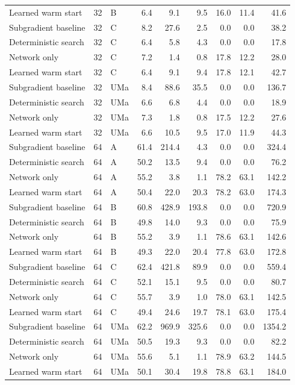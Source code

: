 \documentclass[10pt,letterpaper]{article}
\begin{document}
\begin{longtable}{lrlrrrrrr}
Learned warm start & 32 & B & 6.4 & 9.1 & 9.5 & 16.0 & 11.4 & 41.6\\
Subgradient baseline & 32 & C & 8.2 & 27.6 & 2.5 & 0.0 & 0.0 & 38.2\\
Deterministic search & 32 & C & 6.4 & 5.8 & 4.3 & 0.0 & 0.0 & 17.8\\
Network only & 32 & C & 7.2 & 1.4 & 0.8 & 17.8 & 12.2 & 28.0\\
Learned warm start & 32 & C & 6.4 & 9.1 & 9.4 & 17.8 & 12.1 & 42.7\\
Subgradient baseline & 32 & UMa & 8.4 & 88.6 & 35.5 & 0.0 & 0.0 & 136.7\\
Deterministic search & 32 & UMa & 6.6 & 6.8 & 4.4 & 0.0 & 0.0 & 18.9\\
Network only & 32 & UMa & 7.3 & 1.8 & 0.8 & 17.5 & 12.2 & 27.6\\
Learned warm start & 32 & UMa & 6.6 & 10.5 & 9.5 & 17.0 & 11.9 & 44.3\\
Subgradient baseline & 64 & A & 61.4 & 214.4 & 4.3 & 0.0 & 0.0 & 324.4\\
Deterministic search & 64 & A & 50.2 & 13.5 & 9.4 & 0.0 & 0.0 & 76.2\\
Network only & 64 & A & 55.2 & 3.8 & 1.1 & 78.2 & 63.1 & 142.2\\
Learned warm start & 64 & A & 50.4 & 22.0 & 20.3 & 78.2 & 63.0 & 174.3\\
Subgradient baseline & 64 & B & 60.8 & 428.9 & 193.8 & 0.0 & 0.0 & 720.9\\
Deterministic search & 64 & B & 49.8 & 14.0 & 9.3 & 0.0 & 0.0 & 75.9\\
Network only & 64 & B & 55.2 & 3.9 & 1.1 & 78.6 & 63.1 & 142.6\\
Learned warm start & 64 & B & 49.3 & 22.0 & 20.4 & 77.8 & 63.0 & 172.8\\
Subgradient baseline & 64 & C & 62.4 & 421.8 & 89.9 & 0.0 & 0.0 & 559.4\\
Deterministic search & 64 & C & 52.1 & 15.1 & 9.5 & 0.0 & 0.0 & 80.7\\
Network only & 64 & C & 55.7 & 3.9 & 1.0 & 78.0 & 63.1 & 142.5\\
Learned warm start & 64 & C & 49.4 & 24.6 & 19.7 & 78.1 & 63.0 & 175.4\\
Subgradient baseline & 64 & UMa & 62.2 & 969.9 & 325.6 & 0.0 & 0.0 & 1354.2\\
Deterministic search & 64 & UMa & 50.5 & 19.3 & 9.3 & 0.0 & 0.0 & 82.2\\
Network only & 64 & UMa & 55.6 & 5.1 & 1.1 & 78.9 & 63.2 & 144.5\\
Learned warm start & 64 & UMa & 50.1 & 30.4 & 19.8 & 78.8 & 63.1 & 184.0\\\end{longtable}\endgroup\endgroup
\end{document}
